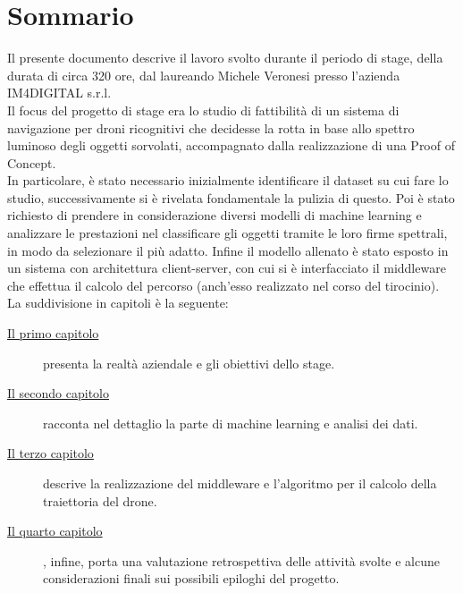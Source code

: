 
\cleardoublepage
{}
{}
\begingroup
\let\clearpage\relax
\let\cleardoublepage\relax
\let\cleardoublepage\relax

\chapter*{Sommario}

Il presente documento descrive il lavoro svolto durante il periodo di stage, della durata di circa 320 ore, dal laureando Michele Veronesi presso l'azienda IM4DIGITAL s.r.l.\\
Il focus del progetto di stage era lo studio di fattibilità di un sistema di navigazione per droni ricognitivi che decidesse la rotta in base allo spettro luminoso degli oggetti sorvolati,
accompagnato dalla realizzazione di una Proof of Concept.\\
In particolare, è stato necessario inizialmente identificare il dataset su cui fare lo studio, successivamente si è rivelata fondamentale la pulizia di questo.
Poi è stato richiesto di prendere in considerazione diversi modelli di machine learning e analizzare le prestazioni nel classificare gli oggetti tramite le loro firme spettrali,
in modo da selezionare il più adatto.
Infine il modello allenato è stato esposto in un sistema con architettura client-server, con cui si è interfacciato il middleware che effettua il calcolo del percorso (anch'esso realizzato nel corso del tirocinio).\\
La suddivisione in capitoli è la seguente:
\begin{description}
    \item[{\hyperref[cap:introduzione]{Il primo capitolo}}] presenta la realtà aziendale e gli obiettivi dello stage.
    
    \item[{\hyperref[cap:machine-learning]{Il secondo capitolo}}] racconta nel dettaglio la parte di machine learning e analisi dei dati.
    
    \item[{\hyperref[cap:business-logic]{Il terzo capitolo}}] descrive la realizzazione del middleware e l'algoritmo per il calcolo della traiettoria del drone.
    
    \item[{\hyperref[cap:conclusione]{Il quarto capitolo}}], infine, porta una valutazione retrospettiva delle attività svolte e alcune considerazioni finali sui possibili epiloghi del progetto.
\end{description}
%
%

\endgroup			

\vfill

